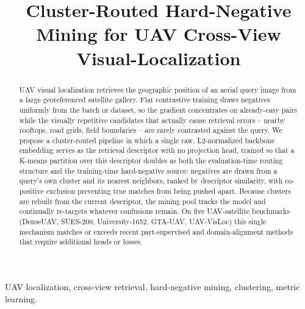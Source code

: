 \documentclass[conference]{IEEEtran}
\begin{document}
\title{Cluster-Routed Hard-Negative Mining for UAV Cross-View Visual-Localization}

\author{
\and
{}
}

\maketitle

\begin{abstract}
UAV visual localization retrieves the geographic position of an aerial
query image from a large georeferenced satellite gallery. Flat contrastive
training draws negatives uniformly from the batch or dataset, so the
gradient concentrates on already-easy pairs while the visually repetitive
candidates that actually cause retrieval errors -- nearby rooftops, road
grids, field boundaries -- are rarely contrasted against the query. We
propose a cluster-routed pipeline in which a single raw, L2-normalized
backbone embedding serves as the retrieval descriptor with no projection
head, trained so that a K-means partition over this descriptor doubles as
both the evaluation-time routing structure and the training-time
hard-negative source: negatives are drawn from a query's own cluster and
its nearest neighbors, ranked by descriptor similarity, with co-positive
exclusion preventing true matches from being pushed apart. Because
clusters are rebuilt from the current descriptor, the mining pool tracks
the model and continually re-targets whatever confusions remain. On five
UAV-satellite benchmarks (DenseUAV, SUES-200, University-1652, GTA-UAV,
UAV-VisLoc) this single mechanism matches or exceeds recent
part-supervised and domain-alignment methods that require additional
heads or losses.
\end{abstract}

\begin{IEEEkeywords}
UAV localization, cross-view retrieval, hard-negative mining, clustering,
metric learning.
\end{IEEEkeywords}
\end{document}

